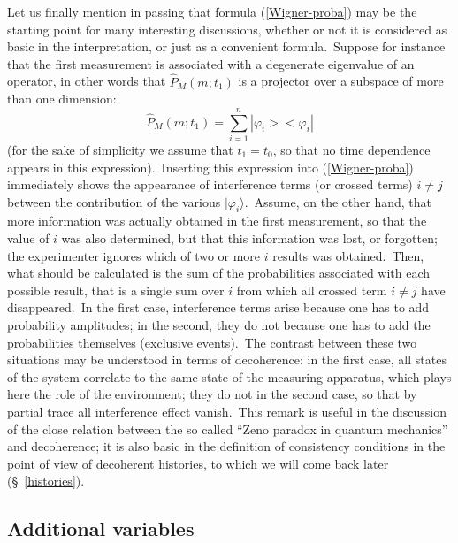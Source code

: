 \documentclass[12pt,onecolumn]{article}%
\begin{document}
Let us finally mention in passing that formula (\ref{Wigner-proba}) may be the
starting point for many interesting discussions, whether or not it is
considered as basic in the interpretation, or just as a convenient
formula.\ Suppose for instance that the first measurement is associated with a
degenerate eigenvalue of an operator, in other words that $\widehat{P}%
_{M}(m;t_{1})$ is a projector over a subspace of more than one dimension:%
\begin{equation}
\widehat{P}_{M}(m;t_{1})=\sum_{i=1}^{n}|\varphi_{i}><\varphi_{i}%
|\label{proj}%
\end{equation}
(for the sake of simplicity we assume that $t_{1}=t_{0}$, so that no time
dependence appears in this expression).\ Inserting this expression into
(\ref{Wigner-proba}) immediately shows the appearance of interference terms
(or crossed terms) $i\neq j$ between the contribution of the various
$|\varphi_{i}\rangle$.\ Assume, on the other hand, that more information was
actually obtained in the first measurement, so that the value of $i$ was also
determined, but that this information was lost, or forgotten; the experimenter
ignores which of two or more $i$ results was obtained.\ Then, what should be
calculated is the sum of the probabilities associated with each possible
result, that is a single sum over $i$ from which all crossed term $i\neq j$
have disappeared.\ In the first case, interference terms arise because one has
to add probability amplitudes; in the second, they do not because one has to
add the probabilities themselves (exclusive events).\ The contrast between
these two situations may be understood in terms of decoherence: in the first
case, all states of the system correlate to the same state of the measuring
apparatus, which plays here the role of the environment; they do not in the
second case, so that by partial trace all interference effect vanish.\ This
remark is useful in the discussion of the close relation between the so called
``Zeno paradox in quantum mechanics'' \cite{Zeno} and decoherence; it is also
basic in the definition of consistency conditions in the point of view of
decoherent histories, to which we will come back later (\S \ \ref{histories}).

\subsection{Additional variables}

\label{additional}
\end{document}
